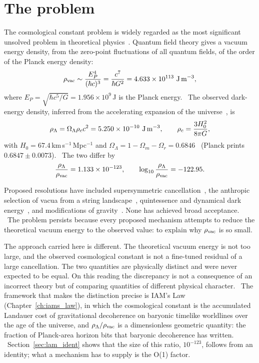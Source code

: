\section{The problem}
The cosmological constant problem is widely regarded as the most significant unsolved problem in theoretical
physics~\cite{Weinberg1989,Martin2012}. Quantum field theory gives a vacuum energy density, from the zero-point fluctuations of all
quantum fields, of the order of the Planck energy density:
\begin{equation}
\rho_{\rm vac}\sim\frac{E_P^4}{(\hbar c)^3}=\frac{c^7}{\hbar G^2}=4.633\times10^{113}\ {\rm J\,m^{-3}},\label{eq:lam_rhovac}
\end{equation}
where $E_P=\sqrt{\hbar c^5/G}=1.956\times10^9$\,J is the Planck energy. \calc\ The observed dark-energy density, inferred from the
accelerating expansion of the universe~\cite{Riess1998,Perlmutter1999}, is
\begin{equation}
\rho_\Lambda=\Omega_\Lambda\rho_cc^2=5.250\times10^{-10}\ {\rm J\,m^{-3}},\qquad \rho_c=\frac{3H_0^2}{8\pi G},\label{eq:lam_rhoL}
\end{equation}
with $H_0=67.4$\,km\,s$^{-1}$\,Mpc$^{-1}$ and $\Omega_\Lambda=1-\Omega_m-\Omega_r=0.6846$~\cite{Planck2018VI} (Planck prints $0.6847\pm0.0073$). \observed\ The two differ by
\begin{equation}
\frac{\rho_\Lambda}{\rho_{\rm vac}}=1.133\times10^{-123},\qquad \log_{10}\frac{\rho_\Lambda}{\rho_{\rm vac}}=-122.95 .\label{eq:lam_ratio}
\end{equation}
\calc

Proposed resolutions have included supersymmetric cancellation~\cite{Witten2001}, the anthropic selection of vacua from a string
landscape~\cite{BoussoPolchinski2000}, quintessence and dynamical dark energy~\cite{Caldwell1998}, and modifications of
gravity~\cite{Weinberg1989,Carroll2001}. None has achieved broad acceptance. \observed\ The problem persists because every proposed mechanism
attempts to reduce the theoretical vacuum energy to the observed value: to explain why $\rho_{\rm vac}$ is so small. \interp

The approach carried here is different. The theoretical vacuum energy is not too large, and the observed cosmological constant is not
a fine-tuned residual of a large cancellation. The two quantities are physically distinct and were never expected to be equal. On
this reading the discrepancy is not a consequence of an incorrect theory but of comparing quantities of different physical
character. \interp\ The framework that makes the distinction precise is IAM's Law (Chapter~\ref{ch:iams_law}), in which the
cosmological constant is the accumulated Landauer cost of gravitational decoherence on baryonic timelike worldlines over the age of
the universe, and $\rho_\Lambda/\rho_{\rm vac}$ is a dimensionless geometric quantity: the fraction of Planck-area horizon bits that
baryonic decoherence has written. \conjecture\ Section~\ref{sec:lam_ident} shows that the size of this ratio, $10^{-123}$, follows
from an identity; what a mechanism has to supply is the O(1) factor.


